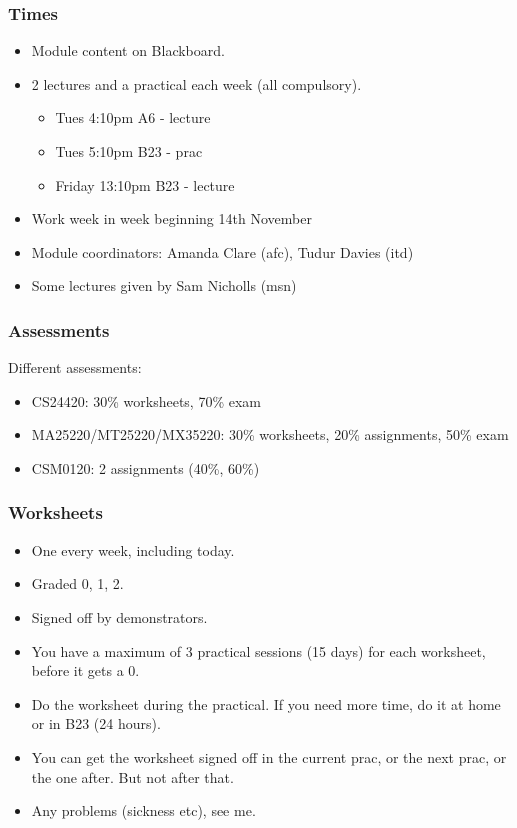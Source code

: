 \documentclass{beamer}
\begin{document}
\begin{frame}
\frametitle{Times}
\begin{itemize}
\item Module content on Blackboard.
\item 2 lectures and a practical each week (all compulsory).
\begin{itemize}
\item Tues 4:10pm A6 - lecture
\item Tues 5:10pm B23 - prac
\item Friday 13:10pm B23 - lecture 
\end{itemize}
\item Work week in week beginning 14th November 
\item Module coordinators: Amanda Clare (afc), Tudur Davies (itd)
\item Some lectures given by Sam Nicholls (msn)
\end{itemize}
\end{frame}

\begin{frame}
\frametitle{Assessments}
Different assessments:
\begin{itemize}
\item CS24420: 30\% worksheets, 70\% exam
\item MA25220/MT25220/MX35220: 30\% worksheets, 20\% assignments, 50\% exam
\item CSM0120: 2 assignments (40\%, 60\%) 
\end{itemize}
\end{frame}

\begin{frame}
\frametitle{Worksheets}
\begin{itemize}
\item One every week, including today.
\item Graded 0, 1, 2.
\item Signed off by demonstrators.
\item You have a maximum of 3 practical sessions (15 days) for each
  worksheet, before it gets a 0.
\item Do the worksheet during the practical. If you need more time, do
  it at home or in B23 (24 hours). 
\item You can get the worksheet signed off in the current prac, or the
  next prac, or the one after. But not after that.
\item Any problems (sickness etc), see me.
\end{itemize}
\end{frame}
\end{document}
